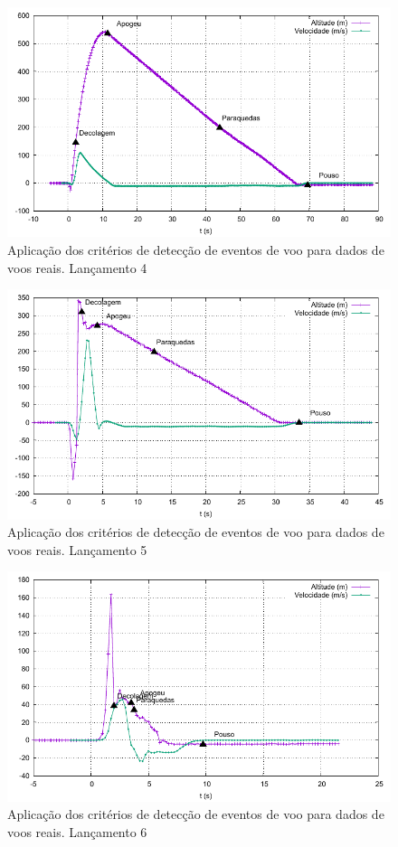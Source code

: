 \documentclass[12pt,a4paper]{article}
\begin{document}
\begin{figure}[!ht]
	\centering
	\includegraphics[width=\textwidth]{./data/lacamentos-def-criterios/lancamento04/trajectory}
	\caption{Aplicação dos critérios de detecção de eventos de voo para dados de voos reais. Lançamento  4}
	\label{fig:lancamento04}
\end{figure}
\begin{figure}[!ht]
	\centering
	\includegraphics[width=\textwidth]{./data/lacamentos-def-criterios/lancamento05/trajectory}
	\caption{Aplicação dos critérios de detecção de eventos de voo para dados de voos reais. Lançamento  5}
	\label{fig:lancamento05}
\end{figure}
\begin{figure}[!ht]
	\centering
	\includegraphics[width=\textwidth]{./data/lacamentos-def-criterios/lancamento06/trajectory}
	\caption{Aplicação dos critérios de detecção de eventos de voo para dados de voos reais. Lançamento  6}
	\label{fig:lancamento06}
\end{figure}
\end{document}
